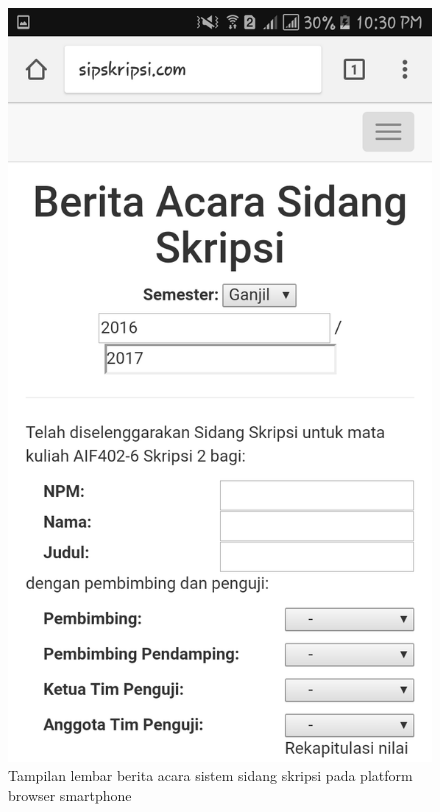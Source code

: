 \begin{figure}[H]
	\centering
	\includegraphics[scale=0.2]{Gambar/hp_beritaacara}
	\caption{Tampilan lembar berita acara sistem sidang skripsi pada platform browser smartphone}
	\label{fig:hp_beritaacara}
\end{figure}

